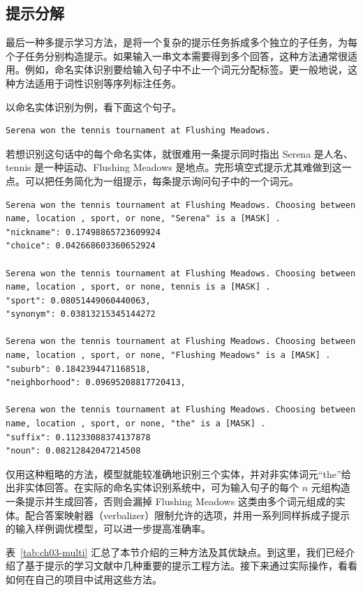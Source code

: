 \subsection{提示分解}
最后一种多提示学习方法，是将一个复杂的提示任务拆成多个独立的子任务，为每个子任务分别构造提示。如果输入一串文本需要得到多个回答，这种方法通常很适用。例如，命名实体识别要给输入句子中不止一个词元分配标签。更一般地说，这种方法适用于词性识别等序列标注任务。

以命名实体识别为例，看下面这个句子。
\begin{lstlisting}[caption={Serena 在法拉盛草地获胜},label={lst:ch03-serena}]
Serena won the tennis tournament at Flushing Meadows.
\end{lstlisting}

若想识别这句话中的每个命名实体，就很难用一条提示同时指出 Serena 是人名、tennis 是一种运动、Flushing Meadows 是地点。完形填空式提示尤其难做到这一点。可以把任务简化为一组提示，每条提示询问句子中的一个词元。

\begin{lstlisting}[caption={提示分解示例},label={lst:ch03-decomp}]
Serena won the tennis tournament at Flushing Meadows. Choosing between name, location , sport, or none, "Serena" is a [MASK] .
"nickname": 0.17498865723609924
"choice": 0.042668603360652924

Serena won the tennis tournament at Flushing Meadows. Choosing between name, location , sport, or none, tennis is a [MASK] .
"sport": 0.08051449060440063,
"synonym": 0.03813215345144272

Serena won the tennis tournament at Flushing Meadows. Choosing between name, location , sport, or none, "Flushing Meadows" is a [MASK] .
"suburb": 0.1842394471168518,
"neighborhood": 0.09695208817720413,

Serena won the tennis tournament at Flushing Meadows. Choosing between name, location , sport, or none, "the" is a [MASK] .
"suffix": 0.11233088374137878
"noun": 0.08212842047214508
\end{lstlisting}

仅用这种粗略的方法，模型就能较准确地识别三个实体，并对非实体词元“the”给出非实体回答。在实际的命名实体识别系统中，可为输入句子的每个 $n$ 元组构造一条提示并生成回答，否则会漏掉 Flushing Meadows 这类由多个词元组成的实体。配合答案映射器（verbalizer）限制允许的选项，并用一系列同样拆成子提示的输入样例调优模型，可以进一步提高准确率。

表~\ref{tab:ch03-multi} 汇总了本节介绍的三种方法及其优缺点。到这里，我们已经介绍了基于提示的学习文献中几种重要的提示工程方法。接下来通过实际操作，看看如何在自己的项目中试用这些方法。


